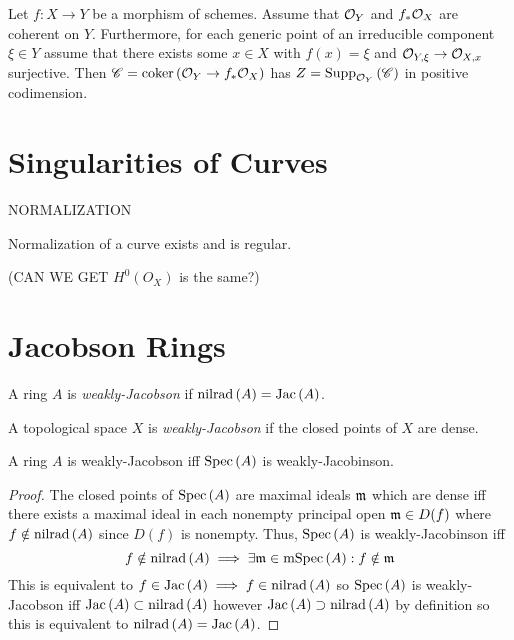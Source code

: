 \documentclass[12pt]{article}
\begin{document}
\begin{lemma}
Let $f : X \to Y$ be a morphism of schemes. Assume that $\mathcal{O}_{Y}$ and $f_* \mathcal{O}_{X}$ are coherent on $Y$. Furthermore, for each generic point of an irreducible component $\xi \in Y$ assume that there exists some $x \in X$ with $f(x) = \xi$ and $\mathcal{O}_{Y, \xi} \to \mathcal{O}_{X, x}$ surjective. Then $\mathscr{C} = \operatorname{\mathrm{coker}}{(\mathcal{O}_{Y} \to f_* \mathcal{O}_{X})}$ has $Z = \mathrm{Supp}_{\mathcal{O}_{Y}}\left(\mathscr{C} \right)$ in positive codimension.
\end{lemma}




\section{Singularities of Curves}


\begin{defn}
NORMALIZATION
\end{defn}

\begin{prop}
Normalization of a curve exists and is regular. 
\end{prop}

(CAN WE GET $H^0(O_X)$ is the same?)


\section{Jacobson Rings}

\begin{definition}
A ring $A$ is \textit{weakly-Jacobson} if $\mathrm{nilrad}\left( A \right) = \mathrm{Jac}\left( A \right)$. 
\end{definition}

\begin{definition}
A topological space $X$ is \textit{weakly-Jacobson} if the closed points of $X$ are dense.
\end{definition}

\begin{proposition}
A ring $A$ is weakly-Jacobson iff $\mathrm{Spec}\left( A \right)$ is weakly-Jacobinson.
\end{proposition}

\begin{proof}
The closed points of $\mathrm{Spec}\left( A \right)$ are maximal ideals $\mathfrak{m}$ which are dense iff there exists a maximal ideal in each nonempty principal open $\mathfrak{m} \in D(f)$ where $f \notin \mathrm{nilrad}\left( A \right)$ since $D(f)$ is nonempty. Thus, $\mathrm{Spec}\left( A \right)$ is weakly-Jacobinson iff 
\[ f \notin \mathrm{nilrad}\left( A \right) \implies \exists \mathfrak{m} \in \mathrm{mSpec}\left( A \right) : f \notin \mathfrak{m} \]  
This is equivalent to $f \in \mathrm{Jac}\left( A \right) \implies f \in \mathrm{nilrad}\left( A \right)$ so $\mathrm{Spec}\left( A \right)$ is weakly-Jacobson iff $\mathrm{Jac}\left( A \right) \subset \mathrm{nilrad}\left( A \right)$ however $\mathrm{Jac}\left( A \right) \supset \mathrm{nilrad}\left( A \right)$ by definition so this is equivalent to $\mathrm{nilrad}\left( A \right) = \mathrm{Jac}\left( A \right)$.
\end{proof}
\end{document}
